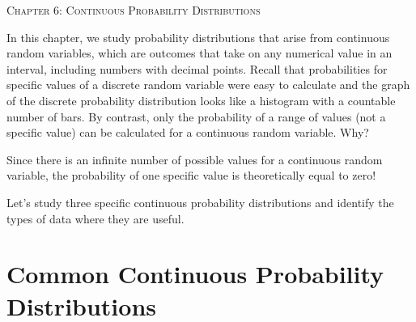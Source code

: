 \documentclass[12pt, letterpaper]{article}
\theoremstyle{definition}
\begin{document}


\begin{center}

{\LARGE \textsc{Chapter 6:  Continuous Probability Distributions}}
\end{center}


\begin{statement}

In this chapter, we study probability distributions that arise from continuous random variables, which are outcomes that take on any numerical value in an interval, including numbers with decimal points.  Recall that probabilities for specific values of a discrete random variable were easy to calculate and the graph of the discrete probability distribution looks like a histogram with a countable number of bars.  By contrast, only the probability of a range of values (not a specific value) can be calculated for a continuous random variable.  Why?

\vspace*{.1in}

Since there is an infinite number of possible values for a continuous random variable, the probability of one specific value is theoretically equal to zero!

\vspace*{.1in}

Let's study three specific continuous probability distributions and identify the types of data where they are useful.

\end{statement}


\section*{Common Continuous Probability Distributions}
\end{document}
